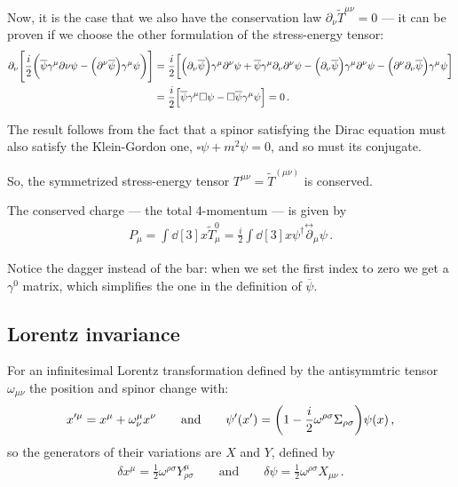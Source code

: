 \documentclass[main.tex]{subfiles}
\begin{document}
Now, it is the case that we also have the conservation law \(\partial_{\nu } \widetilde{T}^{\mu \nu } = 0\) --- it can be proven if we choose the other formulation of the stress-energy tensor:
%
\begin{subequations}
\begin{align}
\partial_{\nu } \qty[\frac{i}{2} \qty(\overline{\psi} \gamma^{\mu }\partial{\nu } \psi - \qty(\partial^{\nu } \overline{\psi}) \gamma^{\mu } \psi )]
&= \frac{i}{2} \qty[\qty(\partial_{\nu } \overline{\psi}) \gamma^{\mu } \partial^{\nu } \psi 
+ \overline{\psi} \gamma^{\mu } \partial_{\nu } \partial^{\nu } \psi 
- \qty(\partial_{\nu } \overline{\psi}) \gamma^{\mu } \partial^{\nu } \psi 
- \qty(\partial^{\nu } \partial_{\nu } \overline{\psi}) \gamma^{\mu } \psi  ]  \\
&= \frac{i}{2} 
\qty[ \overline{\psi} \gamma^{\mu }\square \psi - \square \overline{\psi} \gamma^{\mu } \psi ] = 0
\,.
\end{align}
\end{subequations}

The result follows from the fact that a spinor satisfying the Dirac equation must also satisfy the Klein-Gordon one, \(\square \psi  +m^2 \psi = 0\), and so must its conjugate. 

So, the symmetrized stress-energy tensor \(T^{\mu \nu } = \widetilde{T}^{(\mu \nu )}\) is conserved. 

The conserved charge --- the total 4-momentum --- is given by 
%
\begin{align}
P_{\mu } = \int \dd[3]{x} \widetilde{T}^{0}_{\mu } = \frac{i}{2} 
\int \dd[3]{x} \psi ^\dag \overset{\leftrightarrow}{\partial}_{\mu }\psi   
\,.
\end{align}

Notice the dagger instead of the bar: when we set the first index to zero we get a \(\gamma^{0}\) matrix, which simplifies the one in the definition of \(\overline{\psi}\). 

\subsection{Lorentz invariance}

For an infinitesimal Lorentz transformation defined by the antisymmtric tensor \(\omega_{\mu \nu }\) the position and spinor change with: 
%
\begin{align}
x^{\prime \mu } = x^{\mu } + \omega^{\mu }_{\nu } x^{\nu }
\qquad \text{and} \qquad
\psi^{\prime }( x') 
= \qty(1 - \frac{i}{2} \omega^{\rho \sigma } \Sigma_{\rho \sigma }) \psi (x)
\,,
\end{align}
%
so the generators of their variations are \(X\) and \(Y\), defined by 
%
\begin{align}
\delta x^{\mu } = \frac{1}{2} \omega^{\rho \sigma } Y^{\mu }_{\rho \sigma }
\qquad \text{and} \qquad
\delta \psi = \frac{1}{2} \omega^{\rho \sigma } X_{\mu \nu }
\,.
\end{align}
\end{document}
